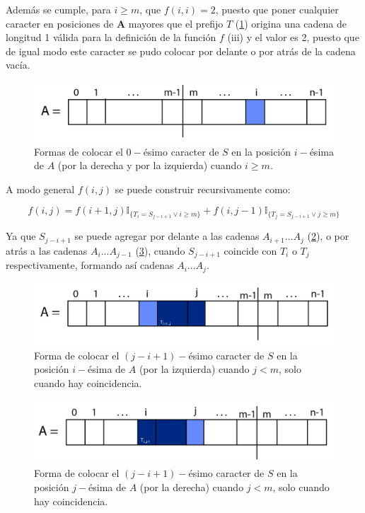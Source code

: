 \documentclass[a4paper]{article}
\begin{document}
    
    
    Adem\'as se cumple, para $i \geq m$, que $f(i,i) = 2$, puesto que poner cualquier caracter en posiciones de \textbf{A} mayores que el prefijo $T$ (\ref{fig:ppp2}) origina una cadena de longitud 1 válida para la definición de la función $f$ (iii) y el valor es 2, puesto que de igual modo este caracter se pudo colocar por delante o por atrás de la cadena vacía.\\
    
    \begin{figure}[!h]
    	\centering
    	\includegraphics[width=0.7\linewidth]{ppp2}
    	\caption{Formas de colocar el $0-$ésimo caracter de $S$ en la posición $i-$ésima de $A$ (por la derecha y por la izquierda) cuando $i \ge m$.}
    	\label{fig:ppp2}
    \end{figure}
     

    A modo general $f(i,j)$ se puede construir recursivamente como: 

    \begin{equation*}
        f(i,j) = f(i+1,j)\mathbb{I}_{ \{T_i = S_{j-i+1} \vee i \geq m \}}  +  f(i,j-1)\mathbb{I}_{ \{T_j = S_{j-i+1} \vee j \geq m \} } 
    \end{equation*}

    Ya que $S_{j-i+1}$ se puede agregar por delante a las cadenas $A_{i+1}...A_j$ (\ref{fig:ppp3}), o por atr\'as a las cadenas 
    $A_{i}...A_{j-1}$ (\ref{fig:ppp4}), cuando $S_{j-i+1}$ coincide con $T_i$ o $T_j$ respectivamente, formando as\'i cadenas $A_{i}...A_{j}$.\\
    
    \begin{figure}[h!]
    	\centering
    	\includegraphics[width=0.7\linewidth]{ppp3}
    	\caption{Forma de colocar el $(j-i+1)-$ésimo caracter de $S$ en la posición $i-$ésima de $A$ (por la izquierda) cuando $j < m$, solo cuando hay coincidencia.}
    	\label{fig:ppp3}
    \end{figure}
    \begin{figure}[h!]
    	\centering
    	\includegraphics[width=0.7\linewidth]{ppp4}
    	\caption{Forma de colocar el $(j-i+1)-$ésimo caracter de $S$ en la posición $j-$ésima de $A$ (por la derecha) cuando $j < m$, solo cuando hay coincidencia.}
    	\label{fig:ppp4}
    \end{figure}
    
\end{document}
